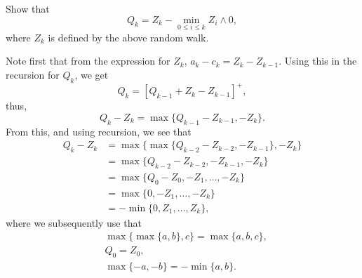 \begin{question}
Show that 
\begin{equation*}
  Q_k = Z_k - \min_{0\leq i \leq k} Z_i\wedge 0,
\end{equation*}
where $Z_k$ is defined by the above random walk.  

 
\begin{solution}
Note first that from the expression
for $Z_k$, $a_k - c_k = Z_k - Z_{k-1}$. Using this in the recursion
for $Q_k$, we get
\begin{equation*}
  Q_k = [Q_{k-1} +Z_k- Z_{k-1}]^+,
\end{equation*}
thus, 
\begin{equation*}
  Q_k - Z_{k} = \max\{Q_{k-1} - Z_{k-1}, -Z_k\}.
\end{equation*}
From this, and using recursion, we see that
\begin{equation*}
  \begin{split}
  Q_k - Z_{k} 
&= \max\{\max\{Q_{k-2} - Z_{k-2}, -Z_{k-1}\}, -Z_k\} \\
&= \max\{Q_{k-2} - Z_{k-2}, -Z_{k-1}, -Z_k\} \\
&= \max\{Q_{0} - Z_{0}, -Z_1, \ldots, -Z_k\} \\
&= \max\{0, -Z_1, \ldots, -Z_k\} \\
&= - \min\{0, Z_1, \ldots, Z_k\},
  \end{split}
  \end{equation*}
where we subsequently use that
\begin{align*}
&\max\{\max\{a,b\}, c\} = \max\{a,b,c\}, \\
&Q_0 = Z_0, \\
&\max\{-a, -b \} = -\min\{a,b\}.
\end{align*}
 
  
\end{solution}
\end{question}


